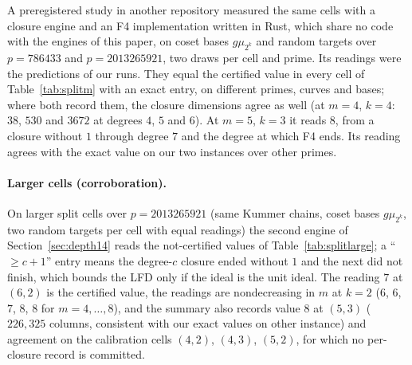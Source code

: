 \documentclass[11pt]{article}
\theoremstyle{definition}\newtheorem{definition}[theorem]{Definition}
\theoremstyle{remark}\newtheorem{remark}[theorem]{Remark}
\begin{document}
A preregistered study in another repository measured the same cells
with a closure engine and an F4 implementation written in Rust, which share
no code with the engines of this paper, on coset bases $g\mu_{2^k}$ and
random targets over $p=786433$ and $p=2013265921$, two draws per cell and
prime. Its readings were the predictions of our runs. They equal the
certified value in every cell of Table~\ref{tab:splitm} with an exact entry,
on different primes, curves and bases; where both record them, the closure
dimensions agree as well (at $m=4$, $k=4$: $38$, $530$ and $3672$ at
degrees $4$, $5$ and $6$). At $m=5$, $k=3$ it reads $8$, from a closure
without $1$ through degree $7$ and the degree at which F4 ends. Its
reading agrees with the exact value on our two instances over other primes.

\paragraph{Larger cells (corroboration).}
On larger split cells over $p=2013265921$ (same Kummer chains, coset bases
$g\mu_{2^k}$, two random targets per cell with equal readings) the second
engine of Section~\ref{sec:depth14} reads the not-certified values of
Table~\ref{tab:splitlarge}; a ``$\ge c{+}1$'' entry means the degree-$c$
closure ended without $1$ and the next did not finish, which bounds the LFD
only if the ideal is the unit ideal. The reading $7$ at $(6,2)$ is the
certified value, the readings are nondecreasing in $m$ at $k=2$ ($6$, $6$,
$7$, $8$, $8$ for $m=4,\ldots,8$), and the summary also records value $8$ at
$(5,3)$ ($226{,}325$ columns, consistent with our exact values on other
instance) and agreement on the calibration cells $(4,2)$, $(4,3)$, $(5,2)$,
for which no per-closure record is committed.
\end{document}
